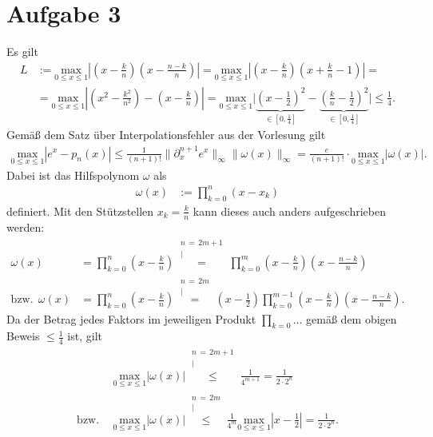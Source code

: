 \documentclass[english, parskip=full]{scrartcl}
\newcommand{\kom}{}
\newcommand{\kla}{}
\newcommand{\tecxt}{}
\begin{document}
\section*{Aufgabe 3}
Es gilt
\begin{align}
L&:=\underset{0\le x\le 1}{\tecxt\text{max}}\left\vert\kla\left( x-\frac{k}{n} \right)\kla\left( x-\frac{n-k}{n} \right)\right\vert=\underset{0\le x\le 1}{\tecxt\text{max}}\left\vert\kla\left( x-\frac{k}{n} \right)\kla\left( x+\frac{k}{n}-1 \right)\right\vert=\\
&=\underset{0\le x\le 1}{\tecxt\text{max}}\left\vert\kla\left( x^2-\frac{k^2}{n^2} \right)-\kla\left( x-\frac{k}{n} \right)\right\vert=\underset{0\le x\le 1}{\tecxt\text{max}}\bigg\vert \underbrace{\kla\left( x-\frac{1}{2} \right)^2}_{\in [0,\frac{1}{4}]}-\underbrace{\kla\left( \frac{k}{n}-\frac{1}{2} \right)^2}_{\in [0,\frac{1}{4}]}\bigg\vert \le \frac{1}{4}.
\end{align}
Gemäß dem Satz über Interpolationsfehler aus der Vorlesung gilt
\begin{align}
\underset{0\le x\le 1}{\tecxt\text{max}}\left\vert e^x-p_n(x)\right\vert\le\frac{1}{(n+1)!}\|\partial_x^{n+1}e^x\|_\infty\|\omega(x)\|_\infty=\frac{e}{(n+1)!}\cdot\underset{0\le x\le 1}{\tecxt\text{max}}\left\vert\omega(x)\right\vert.
\end{align}
Dabei ist das Hilfspolynom $\omega$ als
\begin{align}
\omega(x)&:=\prod_{k=0}^n (x-x_k)
\end{align}
definiert.
Mit den Stützstellen $x_k=\frac{k}{n}$ kann dieses auch anders aufgeschrieben werden:
\begin{align}
\omega(x)&=\prod_{k=0}^n \kla\left( x-\frac{k}{n} \right)\kom\overset{\substack{{n\,=\,2m+1} \\ |}}{=}\prod_{k=0}^{m} \kla\left( x-\frac{k}{n} \right)\kla\left( x-\frac{n-k}{n} \right)\\
\tecxt\text{bzw.}\ \ \omega(x)&=\prod_{k=0}^n \kla\left( x-\frac{k}{n} \right)\kom\overset{\substack{{n\,=\,2m} \\ |}}{=}\kla\left( x-\frac{1}{2} \right)\prod_{k=0}^{m-1} \kla\left( x-\frac{k}{n} \right)\kla\left( x-\frac{n-k}{n} \right).
\end{align}
Da der Betrag jedes Faktors im jeweiligen Produkt $\prod_{k=0}\dots$ gemäß dem obigen Beweis $\le\frac{1}{4}$ ist, gilt 
\begin{align}
&\underset{0\le x\le 1}{\tecxt\text{max}}\left\vert\omega(x)\right\vert \kom\overset{\substack{{n\,=\,2m+1} \\ |}}{\le}\frac{1}{4^{m+1}}=\frac{1}{2\cdot 2^n}\\
\tecxt\text{bzw.}\ \ &\underset{0\le x\le 1}{\tecxt\text{max}}\left\vert\omega(x)\right\vert \kom\overset{\substack{{n\,=\,2m} \\ |}}{\le}\frac{1}{4^{m}}\underset{0\le x\le 1}{\tecxt\text{max}}\left\vert x-\frac{1}{2}\right\vert = \frac{1}{2\cdot 2^n}.
\end{align}
\end{document}
